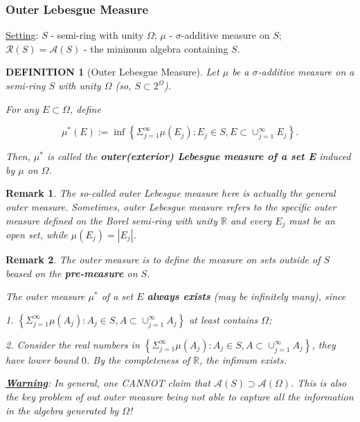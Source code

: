 \documentclass[12pt]{article}
\theoremstyle{blueplain}
\theoremstyle{bluedef}
\newtheorem{definition}{DEFINITION}[section]
\theoremstyle{blueremark}
\newtheorem{remark}{Remark}[section]
\newcommand{\R}{\mathbb{R}}
\numberwithin{equation}{section}
\begin{document}
\subsubsection{Outer Lebesgue Measure}

\underline{Setting}: $S$ - semi-ring with unity $\Omega$; $\mu$ - $\sigma$-additive measure on $S$; $\mathcal{R}(S) = \mathcal{A}(S)$ - the minimum algebra containing $S$.

\begin{definition}[Outer Lebesgue Measure]

  Let $\mu$ be a $\sigma$-additive measure on a semi-ring $S$ with unity $\Omega$ (so, $S \subset 2^\Omega$).

  For any $E \subset \Omega$, define

  \[\mu^*(E) := \inf \left\{ \Sigma_{j=1}^\infty \mu(E_j) : E_j \in S, E \subset \cup_{j=1}^\infty E_j \right\}.\]

  Then, $\mu^*$ is called the \textbf{outer(exterior) Lebesgue measure of a set E} induced by $\mu$ on $\Omega$.
\end{definition}

\begin{remark}
  The so-called outer Lebesgue measure here is actually the general outer measure. Sometimes, outer Lebesgue measure refers to the specific outer measure defined on the Borel semi-ring with unity $\R$ and every $E_j$ must be an open set, while $\mu(E_j) = |E_j|$.
\end{remark}

\begin{remark}
  The outer measure is to define the measure on sets outside of $S$ beased on the \textbf{pre-measure} on $S$.

  The outer measure $\mu^*$ of a set $E$ \textbf{always exists} (may be infinitely many), since

  1. $\left\{ \Sigma_{j=1}^\infty \mu(A_j) : A_j \in S, A \subset \cup_{j=1}^\infty A_j \right\}$ at least contains $\Omega$;

  2. Consider the real numbers in $\left\{ \Sigma_{j=1}^\infty \mu(A_j) : A_j \in S, A \subset \cup_{j=1}^\infty A_j \right\}$, they have lower bound $0$. By the completeness of $\R$, the infimum exists.

  \textbf{\underline{Warning}}: In general, one CANNOT claim that $\mathcal{A}(S) \supset \mathcal{A}(\Omega)$. This is also the key problem of out outer measure being not able to capture all the information in the algebra generated by $\Omega$!
\end{remark}
\end{document}
